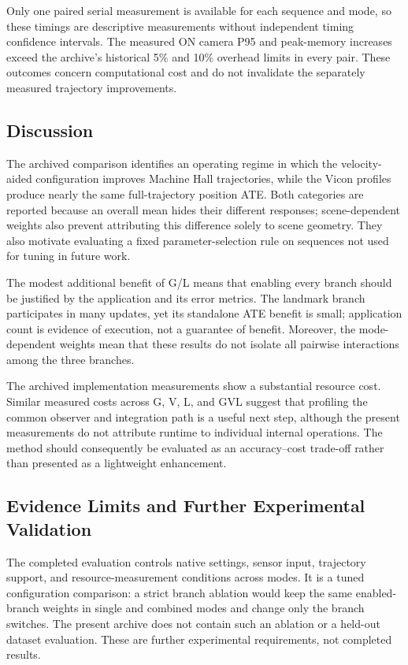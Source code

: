 \documentclass[a4paper,runningheads,twocolumn]{llncs}
\begin{document}
Only one paired serial measurement is available for each sequence and mode, so these timings are descriptive measurements without independent timing confidence intervals. The measured ON camera P95 and peak-memory increases exceed the archive's historical 5\% and 10\% overhead limits in every pair. These outcomes concern computational cost and do not invalidate the separately measured trajectory improvements.

\subsection{Discussion}
The archived comparison identifies an operating regime in which the velocity-aided configuration improves Machine Hall trajectories, while the Vicon profiles produce nearly the same full-trajectory position ATE. Both categories are reported because an overall mean hides their different responses; scene-dependent weights also prevent attributing this difference solely to scene geometry. They also motivate evaluating a fixed parameter-selection rule on sequences not used for tuning in future work.

The modest additional benefit of G/L means that enabling every branch should be justified by the application and its error metrics. The landmark branch participates in many updates, yet its standalone ATE benefit is small; application count is evidence of execution, not a guarantee of benefit. Moreover, the mode-dependent weights mean that these results do not isolate all pairwise interactions among the three branches.

The archived implementation measurements show a substantial resource cost. Similar measured costs across G, V, L, and GVL suggest that profiling the common observer and integration path is a useful next step, although the present measurements do not attribute runtime to individual internal operations. The method should consequently be evaluated as an accuracy--cost trade-off rather than presented as a lightweight enhancement.

\subsection{Evidence Limits and Further Experimental Validation}
The completed evaluation controls native settings, sensor input, trajectory support, and resource-measurement conditions across modes. It is a tuned configuration comparison: a strict branch ablation would keep the same enabled-branch weights in single and combined modes and change only the branch switches. The present archive does not contain such an ablation or a held-out dataset evaluation. These are further experimental requirements, not completed results.
\end{document}
